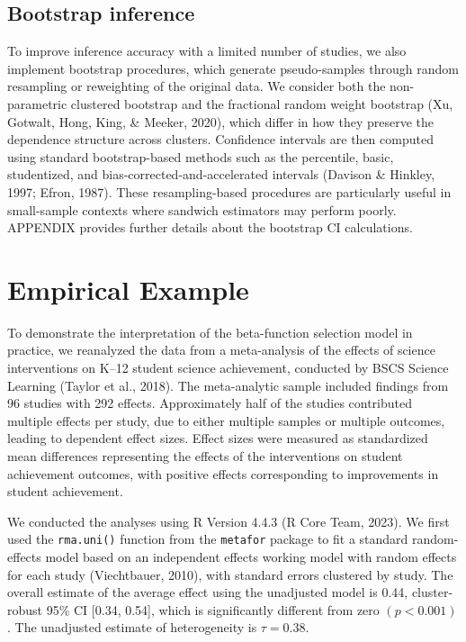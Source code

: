 \documentclass[
  american,
  man, donotrepeattitle,floatsintext]{apa7}
\begin{document}
\subsection{Bootstrap inference}\label{bootstrap-inference}

To improve inference accuracy with a limited number of studies, we also implement bootstrap procedures, which generate pseudo-samples through random resampling or reweighting of the original data. We consider both the non-parametric clustered bootstrap and the fractional random weight bootstrap (Xu, Gotwalt, Hong, King, \& Meeker, 2020), which differ in how they preserve the dependence structure across clusters. Confidence intervals are then computed using standard bootstrap-based methods such as the percentile, basic, studentized, and bias-corrected-and-accelerated intervals (Davison \& Hinkley, 1997; Efron, 1987). These resampling-based procedures are particularly useful in small-sample contexts where sandwich estimators may perform poorly. APPENDIX provides further details about the bootstrap CI calculations.

\section{Empirical Example}\label{empirical-example}

To demonstrate the interpretation of the beta-function selection model in practice, we reanalyzed the data from a meta-analysis of the effects of science interventions on K--12 student science achievement, conducted by BSCS Science Learning (Taylor et al., 2018). The meta-analytic sample included findings from 96 studies with 292 effects. Approximately half of the studies contributed multiple effects per study, due to either multiple samples or multiple outcomes, leading to dependent effect sizes. Effect sizes were measured as standardized mean differences representing the effects of the interventions on student achievement outcomes, with positive effects corresponding to improvements in student achievement.

We conducted the analyses using R Version 4.4.3 (R Core Team, 2023).
We first used the \texttt{rma.uni()} function from the \texttt{metafor} package to fit a standard random-effects model based on an independent effects working model with random effects for each study (Viechtbauer, 2010), with standard errors clustered by study.
The overall estimate of the average effect using the unadjusted model is 0.44, cluster-robust 95\% CI {[}0.34, 0.54{]}, which is significantly different from zero \((p <0.001)\).
The unadjusted estimate of heterogeneity is \(\tau = 0.38\).
\end{document}
